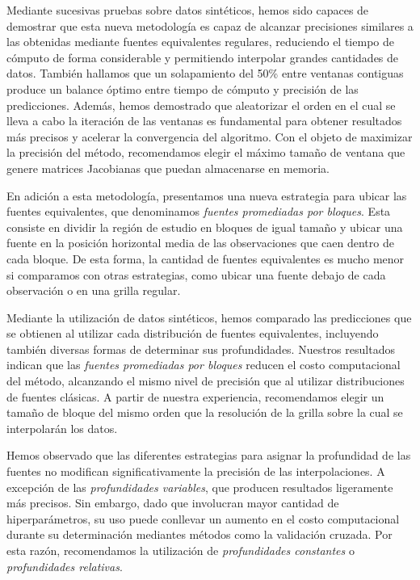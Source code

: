 Mediante sucesivas pruebas sobre datos sintéticos, hemos sido capaces de
demostrar que esta nueva metodología es capaz de alcanzar precisiones similares
a las obtenidas mediante fuentes equivalentes regulares, reduciendo el tiempo
de cómputo de forma considerable y permitiendo interpolar grandes cantidades de
datos.
También hallamos que un solapamiento del 50\% entre ventanas contiguas produce
un balance óptimo entre tiempo de cómputo y precisión de las predicciones.
Además, hemos demostrado que aleatorizar el orden en el cual se lleva a cabo la
iteración de las ventanas es fundamental para obtener resultados más precisos
y acelerar la convergencia del algoritmo.
Con el objeto de maximizar la precisión del método, recomendamos elegir el
máximo tamaño de ventana que genere matrices Jacobianas que puedan almacenarse
en memoria.

En adición a esta metodología, presentamos una nueva estrategia para ubicar las
fuentes equivalentes, que denominamos \emph{fuentes promediadas por bloques}.
Esta consiste en dividir la región de estudio en bloques de igual tamaño
y ubicar una fuente en la posición horizontal media de las observaciones que
caen dentro de cada bloque.
De esta forma, la cantidad de fuentes equivalentes es mucho menor si comparamos
con otras estrategias, como ubicar una fuente debajo de cada observación o en
una grilla regular.

Mediante la utilización de datos sintéticos, hemos comparado las predicciones
que se obtienen al utilizar cada distribución de fuentes equivalentes,
incluyendo también diversas formas de determinar sus profundidades.
Nuestros resultados indican que las \emph{fuentes promediadas por bloques}
reducen el costo computacional del método, alcanzando el mismo nivel de
precisión que al utilizar distribuciones de fuentes clásicas.
A partir de nuestra experiencia, recomendamos elegir un tamaño de bloque del
mismo orden que la resolución de la grilla sobre la cual se interpolarán los
datos.

Hemos observado que las diferentes estrategias para asignar la profundidad de
las fuentes no modifican significativamente la precisión de las
interpolaciones.
A excepción de las \emph{profundidades variables}, que producen resultados
ligeramente más precisos.
Sin embargo, dado que involucran mayor cantidad de hiperparámetros, su uso
puede conllevar un aumento en el costo computacional durante su determinación
mediantes métodos como la validación cruzada.
Por esta razón, recomendamos la utilización de \emph{profundidades constantes}
o \emph{profundidades relativas}.

